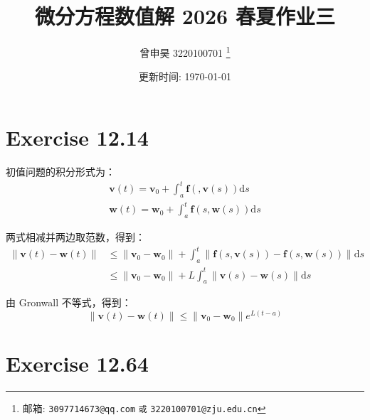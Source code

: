 \documentclass[a4paper]{article}
\begin{document}
\title{微分方程数值解 2026 春夏作业三}

\author{曾申昊 3220100701
  \thanks{邮箱: \texttt{3097714673@qq.com}
                            \texttt{或} \texttt{3220100701@zju.edu.cn}}}

\date{更新时间: \today}

\maketitle

\section*{Exercise 12.14}

\par 初值问题的积分形式为：
\begin{gather}
    \mathbf{v}(t) = \mathbf{v}_0 
    + \int_a^t \mathbf{f}( , \mathbf{v}(s)) \mathrm{d}s\\
    \mathbf{w}(t) = \mathbf{w}_0
    + \int_a^t \mathbf{f}(s, \mathbf{w}(s)) \mathrm{d}s
\end{gather}
\par 两式相减并两边取范数，得到：
\begin{equation}
    \begin{aligned}
        \|\mathbf{v}(t) - \mathbf{w}(t)\| 
        &\leq \|\mathbf{v}_0 - \mathbf{w}_0\| 
        + \int_a^t \|\mathbf{f}(s, \mathbf{v}(s)) - \mathbf{f}(s, \mathbf{w}(s))\| \mathrm{d}s\\
        &\leq \|\mathbf{v}_0 - \mathbf{w}_0\| 
        + L\int_a^t \|\mathbf{v}(s) - \mathbf{w}(s)\| \mathrm{d}s
    \end{aligned}
\end{equation}
\par 由 Gronwall 不等式，得到：
\begin{equation}
    \|\mathbf{v}(t) - \mathbf{w}(t)\|
    \leq \|\mathbf{v}_0 - \mathbf{w}_0\| e^{L(t-a)}
\end{equation}

\section*{Exercise 12.64}
\end{document}
